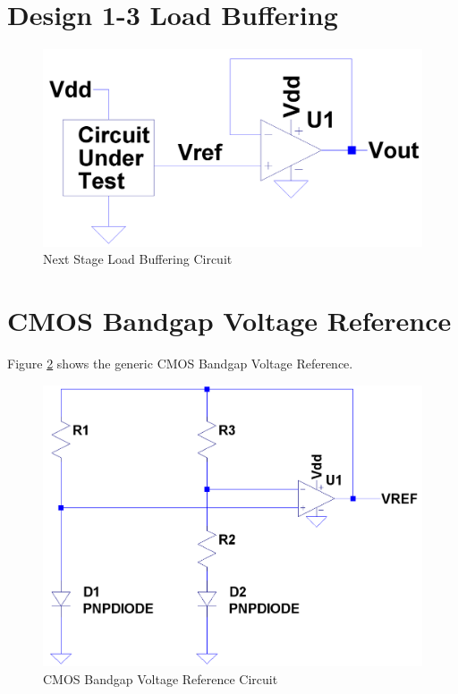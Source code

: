 \documentclass[conference]{IEEEtran}
\begin{document}
\section{Design 1-3 Load Buffering}
	\label{sec:Buff}

\begin{figure}[!htbp]
  	\centering
  	\includegraphics[scale=0.15]{images/loadbuff.png}
  	\caption[loadbuff]{Next Stage Load Buffering Circuit}
  	\label{fig:loadbuff}
	\end{figure}

\section{CMOS Bandgap Voltage Reference}
Figure \ref{fig:bgr-1} shows the generic CMOS Bandgap Voltage Reference. 

\begin{figure}[!htbp]
  	\centering
  	\includegraphics[scale=0.25]{images/bgr-1.png}
  	\caption[bgr-1]{CMOS Bandgap Voltage Reference Circuit}
  	\label{fig:bgr-1}
	\end{figure}
\end{document}
